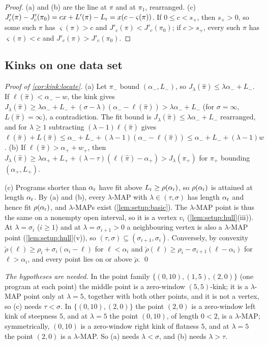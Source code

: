 \begin{proof}
(a) and (b) are the line at $\pi$ and at $\pi_1$, rearranged. (c) $J'_c(\pi)-J'_c(\pi_0)=cx+L'(\pi)-L_{\rm r}=x(c-\varsigma(\pi))$. If $0\le c<s_+$, then $s_+>0$, so some such $\pi$ has $\varsigma(\pi)>c$ and $J'_c(\pi)<J'_c(\pi_0)$; if $c>s_+$, every such $\pi$ has $\varsigma(\pi)<c$ and $J'_c(\pi)>J'_c(\pi_0)$.
\end{proof}

\subsection{Kinks on one data set}\label{app:kinks:data}

\emph{Proof of \cref{cor:kink:locate}.} (a) Let $\pi_-$ bound $(\alpha_-,L_-)$, so $J_\lambda(\hat\pi)\le\lambda\alpha_-+L_-$. If $\ell(\hat\pi)<\alpha_--w$, the kink gives $J_\lambda(\hat\pi)\ge\lambda\alpha_-+L_-+(\sigma-\lambda)(\alpha_--\ell(\hat\pi))>\lambda\alpha_-+L_-$ (for $\sigma=\infty$, $L(\hat\pi)=\infty$), a contradiction. The fit bound is $J_\lambda(\hat\pi)\le\lambda\alpha_-+L_-$ rearranged, and for $\lambda\ge1$ subtracting $(\lambda-1)\ell(\hat\pi)$ gives $\ell(\hat\pi)+L(\hat\pi)\le\alpha_-+L_-+(\lambda-1)(\alpha_--\ell(\hat\pi))\le\alpha_-+L_-+(\lambda-1)w$. (b) If $\ell(\hat\pi)>\alpha_++w_+$, then $J_\lambda(\hat\pi)\ge\lambda\alpha_++L_++(\lambda-\tau)(\ell(\hat\pi)-\alpha_+)>J_\lambda(\pi_+)$ for $\pi_+$ bounding $(\alpha_+,L_+)$.

(c) Programs shorter than $\alpha_{\rm r}$ have fit above $L_{\rm r}\ge\rho(\alpha_{\rm r})$, so $\rho(\alpha_{\rm r})$ is attained at length $\alpha_{\rm r}$. By (a) and (b), every $\lambda$-MAP with $\lambda\in(\tau,\sigma)$ has length $\alpha_{\rm r}$ and hence fit $\rho(\alpha_{\rm r})$, and $\lambda$-MAPs exist (\cref{lem:setup:basic}). The $\lambda$-MAP point is thus the same on a nonempty open interval, so it is a vertex $v_i$ (\cref{lem:setup:hull}(iii)). At $\lambda=\sigma_i$ ($i\ge1$) and at $\lambda=\sigma_{i+1}>0$ a neighbouring vertex is also a $\lambda$-MAP point (\cref{lem:setup:hull}(v)), so $(\tau,\sigma)\subseteq(\sigma_{i+1},\sigma_i)$. Conversely, by convexity $\breve\rho(\ell)\ge\rho_i+\sigma_i(\alpha_i-\ell)$ for $\ell<\alpha_i$ and $\breve\rho(\ell)\ge\rho_i-\sigma_{i+1}(\ell-\alpha_i)$ for $\ell>\alpha_i$, and every point lies on or above $\breve\rho$. \qed

\emph{The hypotheses are needed.} In the point family $\{(0,10),(1,5),(2,0)\}$ (one program at each point) the middle point is a zero-window $(5,5)$-kink; it is a $\lambda$-MAP point only at $\lambda=5$, together with both other points, and it is not a vertex, so (c) needs $\tau<\sigma$. In $\{(0,10),(2,0)\}$ the point $(2,0)$ is a zero-window left kink of steepness $5$, and at $\lambda=5$ the point $(0,10)$, of length $0<2$, is a $\lambda$-MAP; symmetrically, $(0,10)$ is a zero-window right kink of flatness $5$, and at $\lambda=5$ the point $(2,0)$ is a $\lambda$-MAP. So (a) needs $\lambda<\sigma$, and (b) needs $\lambda>\tau$.

